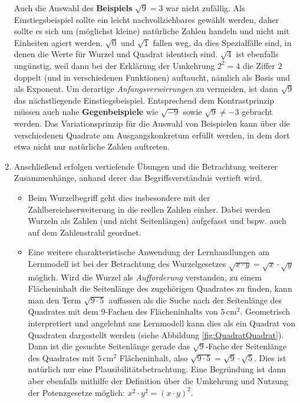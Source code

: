 \documentclass[
]{scrbook}
\theoremstyle{definition}
\theoremstyle{definition}
\theoremstyle{definition}
\theoremstyle{definition}
\theoremstyle{remark}
\begin{document}
\begin{enumerate}
  Auch die Auswahl des \textbf{Beispiels} \(\sqrt{9}=3\) war nicht zufällig. Als Einstiegsbeispiel sollte ein leicht nachvollziehbares gewählt werden, daher sollte es sich um (möglichst kleine) natürliche Zahlen handeln und nicht mit Einheiten agiert werden. \(\sqrt{0}\) und \(\sqrt{1}\) fallen weg, da dies Spezialfälle sind, in denen die Werte für Wurzel und Quadrat identisch sind. \(\sqrt{4}\) ist ebenfalls ungünstig, weil dann bei der Erklärung der Umkehrung \(2^2 = 4\) die Ziffer \(2\) doppelt (und in verschiedenen Funktionen) auftaucht, nämlich als Basis und als Exponent. Um derartige \emph{Anfangsverwirrungen} zu vermeiden, ist dann \(\sqrt{9}\) das nächstliegende Einstiegsbeispiel. Entsprechend dem Kontrastprinzip müssen auch nahe \textbf{Gegenbeispiele} wie \(\sqrt{-9}\) sowie \(\sqrt{9}\neq -3\) gebracht werden. Das Variationsprinzip für die Auswahl von Beispielen kann über die verschiedenen Quadrate am Ausgangskonkretum erfüllt werden, in dem dort etwa nicht nur natürliche Zahlen auftreten.
\item
  Anschließend erfolgen vertiefende Übungen und die Betrachtung weiterer Zusammenhänge, anhand derer das Begriffsverständnis vertieft wird.

  \begin{itemize}
  \item
    Beim Wurzelbegriff geht dies insbesondere mit der Zahlbereichserweiterung in die reellen Zahlen einher. Dabei werden Wurzeln als Zahlen (und nicht Seitenlängen) aufgefasst und bspw. auch auf dem Zahlenstrahl geordnet.
  \item
    Eine weitere charakteristische Anwendung der Lernhandlungen am Lernmodell ist bei der Betrachtung des Wurzelgesetzes \(\sqrt{x\cdot y} = \sqrt{x}\cdot \sqrt{y}\) möglich. Wird die Wurzel als \emph{Aufforderung} verstanden, zu einem Flächeninhalt die Seitenlänge des zugehörigen Quadrates zu finden, kann man den Term \(\sqrt{9\cdot 5}\) auffassen als die Suche nach der Seitenlänge des Quadrates mit dem \(9\)-Fachen des Flächeninhalts von \(5\,\mathrm{cm}^2\). Geometrisch interpretiert und angelehnt ans Lernmodell kann dies als ein Quadrat von Quadraten dargestellt werden (siehe Abbildung \ref{fig:QuadratQuadrat}). Dann ist die gesuchte Seitenlänge gerade das \(\sqrt{9}\)-Fache der Seitenlänge des Quadrates mit \(5\,\mathrm{cm}^2\) Flächeninhalt, also \(\sqrt{9\cdot 5} = \sqrt{9}\cdot \sqrt{5}\). Dies ist natürlich nur eine Plausibilitätsbetrachtung. Eine Begründung ist dann aber ebenfalls mithilfe der Definition über die Umkehrung und Nutzung der Potenzgesetze möglich: \(x^2\cdot y^2 = (x\cdot y)^2\).
  \end{itemize}


\end{enumerate}
\end{document}
